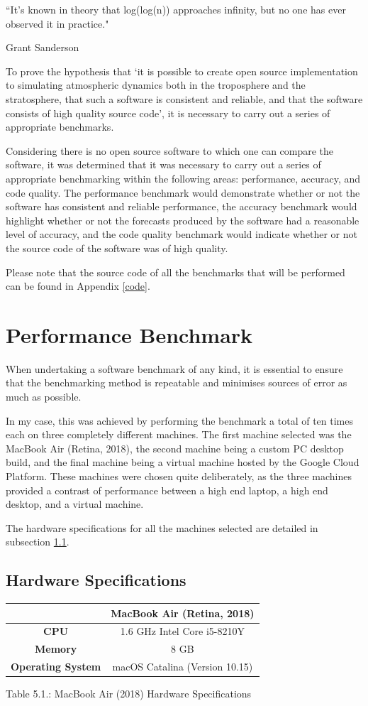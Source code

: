 \epigraph{``It's known in theory that log(log(n)) approaches infinity, but no one has ever observed it in practice."}{Grant Sanderson}

To prove the hypothesis that `it is possible to create open source implementation to simulating atmospheric dynamics both in the troposphere and the stratosphere, that such a software is consistent and reliable, and that the software consists of high quality source code', it is necessary to carry out a series of appropriate benchmarks.

Considering there is no open source software to which one can compare the software, it was determined that it was necessary to carry out a series of appropriate benchmarking within the following areas: performance, accuracy, and code quality. The performance benchmark would demonstrate whether or not the software has consistent and reliable performance, the accuracy benchmark would highlight whether or not the forecasts produced by the software had a reasonable level of accuracy, and the code quality benchmark would indicate whether or not the source code of the software was of high quality.

Please note that the source code of all the benchmarks that will be performed can be found in Appendix \ref{code}.

\section{Performance Benchmark}
When undertaking a software benchmark of any kind, it is essential to ensure that the benchmarking method is repeatable and minimises sources of error as much as possible.

In my case, this was achieved by performing the benchmark a total of ten times each on three completely different machines. The first machine selected was the MacBook Air (Retina, 2018), the second machine being a custom PC desktop build, and the final machine being a virtual machine hosted by the Google Cloud Platform. These machines were chosen quite deliberately, as the three machines provided a contrast of performance between a  high end laptop, a high end desktop, and a virtual machine. 

The hardware specifications for all the machines selected are detailed in subsection \ref{specs}.

\subsection{Hardware Specifications}\label{specs}
\begin{center}
\begin{tabular}{|c|c|} 
 \hline
  & MacBook Air (Retina, 2018) \\
 \hline
 \textbf{CPU} & 1.6 GHz Intel Core i5-8210Y \\
 \hline
 \textbf{Memory} & 8 GB \\
 \hline
 \textbf{Operating System} & macOS Catalina (Version 10.15) \\
 \hline
\end{tabular}\par
\bigskip
Table 5.1.: MacBook Air (2018) Hardware Specifications
\end{center}

